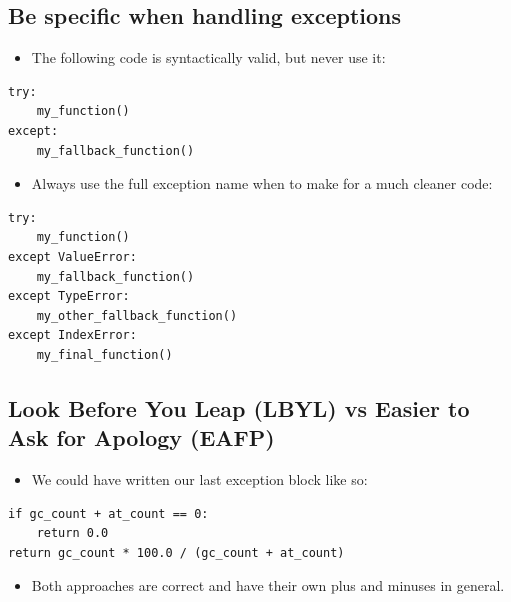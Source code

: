 \documentclass[aspectratio=1610,slidestop]{beamer}
\begin{document}
\subsection{Be specific when handling exceptions}
\begin{pframe}
 \vspace{-0.5cm}
 \begin{itemize}
  \item The following code is syntactically valid, but never use it:
 \end{itemize}
 \vspace{-0.3cm}
 \begin{pythoncode}
   \begin{verbatim}
try:
    my_function()
except:
    my_fallback_function()
    \end{verbatim}
  \end{pythoncode}
 \begin{itemize}
  \item Always use the full exception name when to make for a much cleaner code:
 \end{itemize}
 \vspace{-0.3cm}
 \begin{pythoncode}
   \begin{verbatim}
try:
    my_function()
except ValueError:
    my_fallback_function()
except TypeError:
    my_other_fallback_function()
except IndexError:
    my_final_function()
    \end{verbatim}
  \end{pythoncode}
\end{pframe}


\subsection{Look Before You Leap (LBYL) vs Easier to Ask for Apology (EAFP)}
\begin{pframe}
 \vspace{-0.5cm}
 \begin{itemize}
  \item We could have written our last exception block like so:
 \end{itemize}
 \vspace{-0.3cm}
 \begin{pythoncode}
   \begin{verbatim}
if gc_count + at_count == 0:
    return 0.0
return gc_count * 100.0 / (gc_count + at_count)
    \end{verbatim}
  \end{pythoncode}
 \begin{itemize}
  \item Both approaches are correct and have their own plus and minuses in
  general.
 \end{itemize}
\end{pframe}

\end{document}
